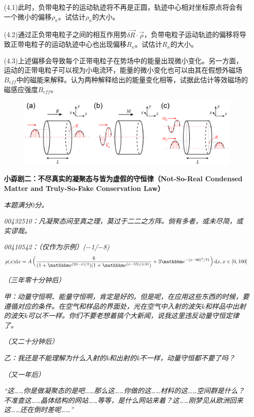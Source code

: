 \documentclass[11pt,a4paper,onecolumn,UTF8]{ctexart}
\begin{document}
	(4.1)此时，负带电粒子的运动轨迹将不再是正圆，轨迹中心相对坐标原点将会有一个微小的偏移$\rho_{\kappa}$。试估计$\rho_{\kappa}$的大小。
	
	(4.2)通过正负带电粒子之间的相互作用势$\delta\vec R\cdot\vec\rho$，负带电粒子运动轨迹的偏移将导致正带电粒子的运动轨迹中心也出现偏移$R_{\kappa}$。试估计$R_{\kappa}$的大小。
	
	(4.3)上述偏移会导致每个正带电粒子在势场中的能量出现微小变化。另一方面，运动的正带电粒子可以视为小电流环，能量的微小变化也可以由其在假想外磁场$B_{eff}$中的磁能来解释。认为两种解释给出的能量变化相等，试据此估计等效磁场的磁感应强度$B_{eff}$。
	
	\begin{figure}[!bh]
		\centering
		\includegraphics[width=0.99\columnwidth]{2.png}
	\end{figure}
	
	\newpage
	\noindent
	\textbf{小孬剧二：不尽真实的凝聚态与皆为虚假的守恒律（Not-So-Real Condensed Matter and Truly-So-Fake Conservation Law）}
	
	\textit{本题满分$0$分。}
	
	\textit{00432510：凡凝聚态间至真之理，莫过于二二之方阵。倘有多者，或未尽简，或实谬哉。}
	
	\textit{00410542：（仅作为示例）($-$1/$-$8)}
	$$p(x)\ud x=A\left(\frac{6}{(1+\ue^{(20-x)/3})(1+\ue^{(x-55)/4.91})}+3\ue^{-(x-96)^2/71}\right)\ud x, x\in[0,100]$$
	
	\textit{（三年零十分钟后）}
	
	\textit{甲：动量守恒啊、能量守恒啊，肯定是好的。但是呢，在应用这些东西的时候，要遵循对应的条件。在空气和样品的界面处，光在空气中入射的波矢$k$和样品中出射的波矢$k$可以不一样。你们不要老想着搞个大新闻，说我这里违反动量守恒定律了。}
	
	\textit{（又二十分钟后）}
	
	\textit{乙：我还是不能理解为什么入射的k和出射的k不一样，动量守恒都不要了吗？}
	
	\textit{（又一年后）}
	
	\textit{%
	“这……你是做凝聚态的是吧……那么这……你做的这……材料的这……空间群是什么？不准查这……晶体结构的网站……等等，是什么网站来着？这……刚梦见从欧洲回来这……还在倒时差呢……”\faMapMarker}\\
	
\end{document}
